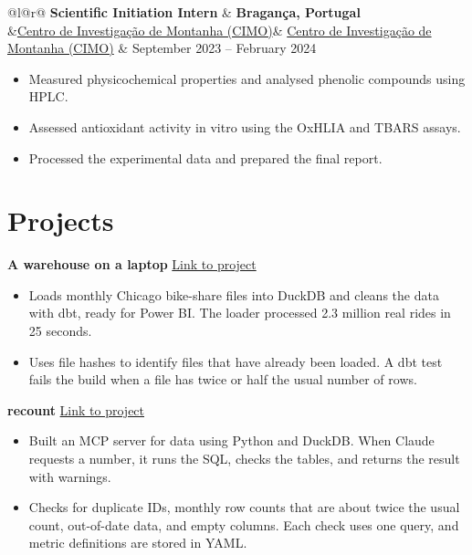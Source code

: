 \documentclass[10pt,a4paper]{article}
\makeatletter
\newcommand{\resumeSubheading}[4]{%
    \noindent%
    \begin{tabular*}{\textwidth}{@{}l@{\extracolsep{\fill}}r@{}}
        \textbf{#1} & \textbf{#3} \\
        \ifx&#2& \else #2 \fi & #4 \\
    \end{tabular*}%
    \vspace{-2pt}%
}
\makeatother
\begin{document}
\vspace{2pt}

\resumeSubheading
    {Scientific Initiation Intern}{\href{https://cimo.ipb.pt}{\textcolor{linkblue}{Centro de Investiga\c{c}\~ao de Montanha (CIMO)}}}
    {Bragan\c{c}a, Portugal}{September 2023 -- February 2024}

\begin{itemize}
    \item Measured physicochemical properties and analysed phenolic compounds using HPLC.
    \item Assessed antioxidant activity in vitro using the OxHLIA and TBARS assays.
    \item Processed the experimental data and prepared the final report.
\end{itemize}

\section{Projects}

\noindent\textbf{A warehouse on a laptop} \hfill \href{https://github.com/manisha-subedi/laptop-warehouse}{\textcolor{linkblue}{Link to project}}
\begin{itemize}
    \item Loads monthly Chicago bike-share files into DuckDB and cleans the data with dbt, ready for Power BI. The loader processed 2.3 million real rides in 25 seconds.
    \item Uses file hashes to identify files that have already been loaded. A dbt test fails the build when a file has twice or half the usual number of rows.
\end{itemize}

\vspace{2pt}

\noindent\textbf{recount} \hfill \href{https://github.com/manisha-subedi/recount}{\textcolor{linkblue}{Link to project}}
\begin{itemize}
    \item Built an MCP server for data using Python and DuckDB. When Claude requests a number, it runs the SQL, checks the tables, and returns the result with warnings.
    \item Checks for duplicate IDs, monthly row counts that are about twice the usual count, out-of-date data, and empty columns. Each check uses one query, and metric definitions are stored in YAML.
\end{itemize}
\end{document}
